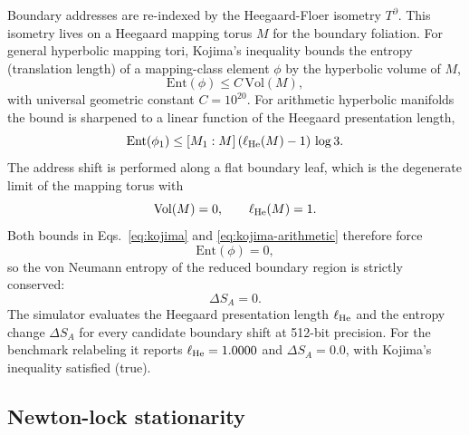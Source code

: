 \documentclass[aps,pra,10pt,onecolumn,superscriptaddress,nofootinbib,longbibliography,floatfix]{revtex4-2}
\newcommand{\ExoticHeegaardPresLength}{1.0000}%
\newcommand{\ExoticHeegaardEntropyChange}{0.0}%
\newcommand{\ExoticKojimaSatisfied}{true}%
\begin{document}
Boundary addresses are re-indexed by the Heegaard-Floer isometry $T^\partial$.  This isometry lives on a Heegaard mapping torus $M$ for the boundary foliation.  For general hyperbolic mapping tori, Kojima's inequality bounds the entropy (translation length) of a mapping-class element $\phi$ by the hyperbolic volume of $M$,
%
\begin{equation}
\label{eq:kojima}
\mathrm{Ent}(\phi) \le C \, \mathrm{Vol}(M) ,
\end{equation}
%
with universal geometric constant $C = 10^{20}$.  For arithmetic hyperbolic manifolds the bound is sharpened to a linear function of the Heegaard presentation length,
%
\begin{equation}
\label{eq:kojima-arithmetic}
\mathrm{Ent}(\phi_1) \le [M_1 : M] \, (\ell_{\rm He}(M) - 1) \, \log 3 .
\end{equation}
%
The address shift is performed along a flat boundary leaf, which is the degenerate limit of the mapping torus with
%
\begin{equation}
\mathrm{Vol}(M) = 0 ,
\qquad
\ell_{\rm He}(M) = 1 .
\end{equation}
%
Both bounds in Eqs.~\eqref{eq:kojima} and \eqref{eq:kojima-arithmetic} therefore force
%
\begin{equation}
\mathrm{Ent}(\phi) = 0,
\end{equation}
%
so the von Neumann entropy of the reduced boundary region is strictly conserved:
%
\begin{equation}
\Delta S_A = 0 .
\label{eq:delta_s_zero}
\end{equation}
%
The simulator evaluates the Heegaard presentation length $\ell_{\rm He}$ and the entropy change $\Delta S_A$ for every candidate boundary shift at 512-bit precision.  For the benchmark relabeling it reports $\ell_{\rm He} = \ExoticHeegaardPresLength{}$ and $\Delta S_A = \ExoticHeegaardEntropyChange{}$, with Kojima's inequality satisfied (\ExoticKojimaSatisfied{}).

\subsection{Newton-lock stationarity}
\end{document}
